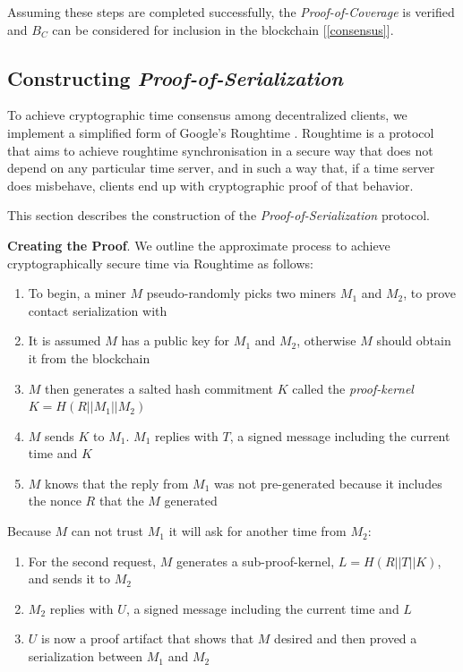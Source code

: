 \documentclass[letterpaper,11pt]{article}
\begin{document}
Assuming these steps are completed successfully, the \emph{Proof-of-Coverage} is verified and $B_C$ can be considered for inclusion in the blockchain [\ref{consensus}].

\subsection{Constructing \emph{Proof-of-Serialization}}

To achieve cryptographic time consensus among decentralized clients, we implement a simplified form of Google’s Roughtime \cite{roughtime}. Roughtime is a protocol that aims to achieve roughtime synchronisation in a secure way that does not depend on any particular time server, and in such a way that, if a time server does misbehave, clients end up with cryptographic proof of that behavior.

This section describes the construction of the \emph{Proof-of-Serialization} protocol.

\textbf{Creating the Proof}. We outline the approximate process to achieve cryptographically secure time via Roughtime as follows:

\begin{enumerate}
        \item To begin, a miner $M$ pseudo-randomly picks two miners $M_1$ and $M_2$, to prove contact serialization with
        \item It is assumed $M$ has a public key for $M_1$ and $M_2$, otherwise $M$ should obtain it from the blockchain
        \item $M$ then generates a salted hash commitment $K$ called the \emph{proof-kernel} ${K = H\left(R || M_1 || M_2\right)}$
        \item $M$ sends $K$ to $M_1$. $M_1$ replies with $T$, a signed message including the current time and $K$
        \item $M$ knows that the reply from $M_1$ was not pre-generated because it includes the nonce $R$ that the $M$ generated
\end{enumerate}

Because $M$ can not trust $M_1$ it will ask for another time from $M_2$:

\begin{enumerate}
        \item For the second request, $M$ generates a sub-proof-kernel, $L = H\left(R || T || K\right)$, and sends it to $M_2$
        \item $M_2$ replies with $U$, a signed message including the current time and $L$
        \item $U$ is now a proof artifact that shows that $M$ desired and then proved a serialization between $M_1$ and $M_2$
\end{enumerate}
\end{document}
